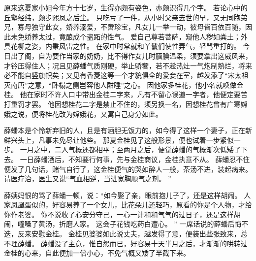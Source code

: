 \par
原来这夏家小姐今年方十七岁，生得亦颇有姿色，亦颇识得几个字。
若论心中的丘壑经纬，颇步熙凤之后尘。
只吃亏了一件，从小时父亲去世的早，又无同胞弟兄，寡母独守此女，娇养溺爱，不啻珍宝，凡女儿一举一动，彼母皆百依百随，因此未免娇养太过，竟酿成个盗跖的性气。
爱自己尊若菩萨，窥他人秽如粪土；外具花柳之姿，内秉风雷之性。
在家中时常就和丫鬟们使性弄气，轻骂重打的。
今日出了阁，自为要作当家的奶奶，比不得作女儿时腼腆温柔，须要拿出这威风来，才钤压得住人；况且见薛蟠气质刚硬，举止骄奢，若不趁热灶一气炮制熟烂，将来必不能自竖旗帜矣；又见有香菱这等一个才貌俱全的爱妾在室，越发添了“宋太祖灭南唐”之意，“卧榻之侧岂容他人酣睡”之心。
因他家多桂花，他小名就唤做金桂。
他在家时不许人口中带出金桂二字来，凡有不留心误道一字者，他便定要苦打重罚才罢。
他因想桂花二字是禁止不住的，须另换一名，因想桂花曾有广寒嫦娥之说，便将桂花改为嫦娥花，又寓自己身分如此。
\par
薛蟠本是个怜新弃旧的人，且是有酒胆无饭力的，如今得了这样一个妻子，正在新鲜兴头上，凡事未免尽让他些。
那夏金桂见了这般形景，便也试着一步紧似一步。
一月之中，二人气概还都相平；至两月之后，便觉薛蟠的气概渐次低矮了下去。
一日薛蟠酒后，不知要行何事，先与金桂商议，金桂执意不从。
薛蟠忍不住便发了几句话，赌气自行了，这金桂便气的哭如醉人一般，茶汤不进，装起病来。
请医疗治，医生又说“气血相逆，当进宽胸顺气之剂。
”\par
薛姨妈恨的骂了薛蟠一顿，说：“如今娶了亲，眼前抱儿子了，还是这样胡闹。
人家凤凰蛋似的，好容易养了一个女儿，比花朵儿还轻巧，原看的你是个人物，才给你作老婆。
你不说收了心安分守己，一心一计和和气气的过日子，还是这样胡闹，噇嗓了黄汤，折磨人家。
这会子花钱吃药白遭心。
”
一席话说的薛蟠后悔不迭，反来安慰金桂。
金桂见婆婆如此说丈夫，越发得了意，便装出些张致来，总不理薛蟠。
薛蟠没了主意，惟自怨而已，好容易十天半月之后，才渐渐的哄转过金桂的心来，自此便加一倍小心，不免气概又矮了半截下来。
